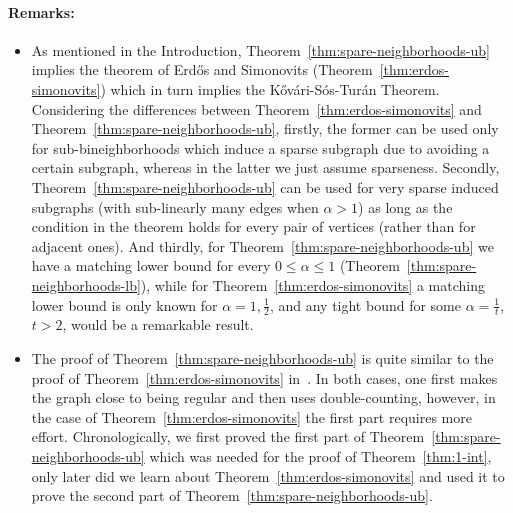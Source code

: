 \documentclass[11pt]{article}
\theoremstyle{definition}
\begin{document}
\paragraph{Remarks:}
\begin{itemize}
	\item
	As mentioned in the Introduction, Theorem~\ref{thm:spare-neighborhoods-ub} implies the theorem of Erd\H{o}s and Simonovits (Theorem~\ref{thm:erdos-simonovits}) which in turn implies the K\H{o}v\'ari-S\'os-Tur\'an Theorem.
	Considering the differences between Theorem~\ref{thm:erdos-simonovits} and Theorem~\ref{thm:spare-neighborhoods-ub}, firstly, the former can be used only for sub-bineighborhoods which induce a sparse subgraph due to avoiding a certain subgraph, whereas in the latter we just assume sparseness. Secondly, Theorem~\ref{thm:spare-neighborhoods-ub} can be used for very sparse induced subgraphs (with sub-linearly many edges when $\alpha > 1$) as long as the condition in the theorem holds for every pair of vertices (rather than for adjacent ones).
	And thirdly, for Theorem~\ref{thm:spare-neighborhoods-ub} we have a matching lower bound for every $0 \le \alpha \le 1$ (Theorem~\ref{thm:spare-neighborhoods-lb}), while for Theorem~\ref{thm:erdos-simonovits} a matching lower bound is only known for $\alpha=1,\frac{1}{2}$, and any tight bound for some $\alpha=\frac{1}{t}$, $t>2$, would be a remarkable result.
	
	\item 
	The proof of Theorem~\ref{thm:spare-neighborhoods-ub} is quite similar to the proof of Theorem~\ref{thm:erdos-simonovits} in~\cite{ES70}.
	In both cases, one first makes the graph close to being regular and then uses double-counting, however, in the case of Theorem~\ref{thm:erdos-simonovits} the first part requires more effort. %
	Chronologically, we first proved the first part of Theorem~\ref{thm:spare-neighborhoods-ub} which was needed for the proof of Theorem~\ref{thm:1-int}, only later did we learn about Theorem~\ref{thm:erdos-simonovits} and used it to prove the second part of Theorem~\ref{thm:spare-neighborhoods-ub}.
	

\end{itemize}
\end{document}
